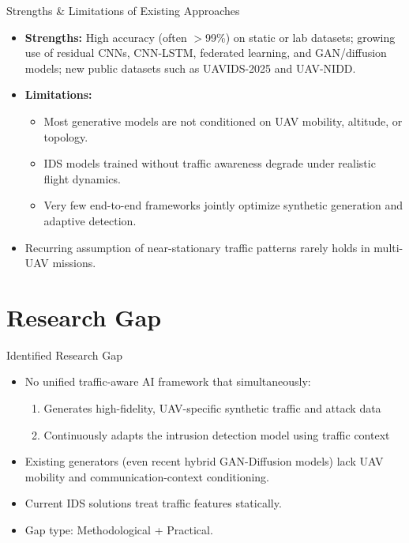 \documentclass[10pt]{beamer}
\begin{document}
\begin{frame}{Strengths \& Limitations of Existing Approaches}
    \begin{itemize}
        \item \textbf{Strengths:} High accuracy (often $>$99\%) on static or lab datasets; growing use of residual CNNs, CNN-LSTM, federated learning, and GAN/diffusion models; new public datasets such as UAVIDS-2025 and UAV-NIDD.
        \item \textbf{Limitations:}
        \begin{itemize}
            \item Most generative models are not conditioned on UAV mobility, altitude, or topology.
            \item IDS models trained without traffic awareness degrade under realistic flight dynamics.
            \item Very few end-to-end frameworks jointly optimize synthetic generation and adaptive detection.
        \end{itemize}
        \item Recurring assumption of near-stationary traffic patterns rarely holds in multi-UAV missions.
    \end{itemize}
\end{frame}

\section{Research Gap}
\begin{frame}{Identified Research Gap}
    \begin{itemize}
        \item No unified traffic-aware AI framework that simultaneously:
        \begin{enumerate}
            \item Generates high-fidelity, UAV-specific synthetic traffic and attack data
            \item Continuously adapts the intrusion detection model using traffic context
        \end{enumerate}
        \item Existing generators (even recent hybrid GAN-Diffusion models) lack UAV mobility and communication-context conditioning.
        \item Current IDS solutions treat traffic features statically.
        \item Gap type: Methodological + Practical.
    \end{itemize}
\end{frame}
\end{document}
